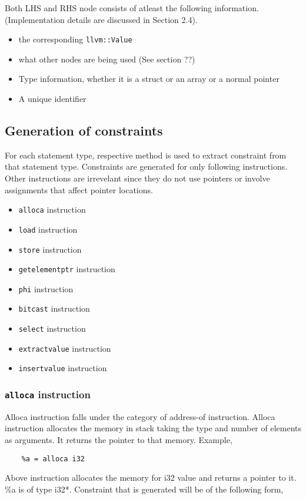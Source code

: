 \documentclass[a4paper,11pt]{report}
\begin{document}
\noindent
Both LHS and RHS node consists of atleast the following information. 
(Implementation details are discussed in Section 2.4).

\begin{itemize}
    \item the corresponding \texttt{llvm::Value}
    \item what other nodes are being used (See section ??)
    \item Type information, whether it is a struct or an array or a normal 
pointer
    \item A unique identifier
\end{itemize}

\subsection{Generation of constraints}
For each statement type, respective method is used to extract constraint from
that statement type. Constraints are generated for only following instructions.
Other instructions are irrevelant since they do not use pointers or involve
assignments that affect pointer locations.

\begin{itemize}
    \item \texttt{alloca} instruction
    \item \texttt{load} instruction
    \item \texttt{store} instruction
    \item \texttt{getelementptr} instruction
    \item \texttt{phi} instruction
    \item \texttt{bitcast} instruction
    \item \texttt{select} instruction
    \item \texttt{extractvalue} instruction
    \item \texttt{insertvalue} instruction
\end{itemize}

\subsubsection{\texttt{alloca} instruction}
Alloca instruction falls under the category of address-of instruction. Alloca 
instruction allocates the memory in stack taking the type and number of 
elements as arguments. It returns the pointer to that memory. 
Example,

\begin{lstlisting}
    %a = alloca i32
\end{lstlisting}
\noindent
Above instruction allocates the memory for i32 value and returns a pointer to 
it. \%a is of type i32*. Constraint that is generated will be of the following 
form,
\end{document}
